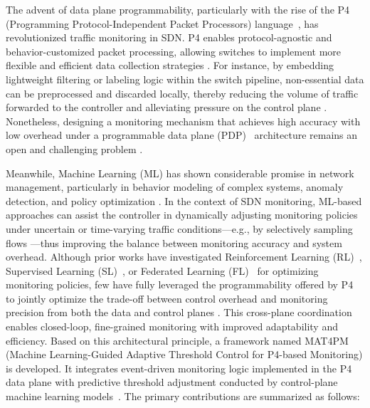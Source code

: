 The advent of data plane programmability, particularly with the rise of the P4 (Programming Protocol-Independent Packet Processors) language~\cite{10.1145/2656877.2656890}, has revolutionized traffic monitoring in SDN. 
P4 enables protocol-agnostic and behavior-customized packet processing, allowing switches to implement more flexible and efficient data collection strategies \cite{HAUSER2023103561}. 
For instance, by embedding lightweight filtering or labeling logic within the switch pipeline, non-essential data can be preprocessed and discarded locally, thereby reducing the volume of traffic forwarded to the controller and alleviating pressure on the control plane \cite{10130445}. 
Nonetheless, designing a monitoring mechanism that achieves high accuracy with low overhead under a programmable data plane (PDP)~\cite{PDP} architecture remains an open and challenging problem \cite{KAUR2021109}.

Meanwhile, Machine Learning (ML) has shown considerable promise in network management, particularly in behavior modeling of complex systems, anomaly detection, and policy optimization \cite{JAMSHIDI2025111103, JISI2025110939, Serag2025, 10480735, 10273389, 10198239, FOSIC2023100466, 9505258}. 
In the context of SDN monitoring, ML-based approaches can assist the controller in dynamically adjusting monitoring policies under uncertain or time-varying traffic conditions---e.g., by selectively sampling flows \cite{9335605}---thus improving the balance between monitoring accuracy and system overhead. 
Although prior works have investigated Reinforcement Learning (RL)~\cite{RL}, Supervised Learning (SL)~\cite{SupervisedLearning}, or Federated Learning (FL)~\cite{FL} for optimizing monitoring policies, few have fully leveraged the programmability offered by P4 to jointly optimize the trade-off between control overhead and monitoring precision from both the data and control planes \cite{SONI2022103419}. 
This cross-plane coordination enables closed-loop, fine-grained monitoring with improved adaptability and efficiency. 
Based on this architectural principle, a framework named MAT4PM (Machine Learning-Guided Adaptive Threshold Control for P4-based Monitoring) is developed. 
It integrates event-driven monitoring logic implemented in the P4 data plane with predictive threshold adjustment conducted by control-plane machine learning models~\cite{MAT4PM}. 
The primary contributions are summarized as follows:

